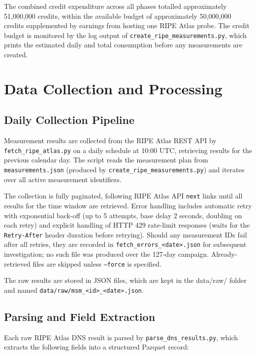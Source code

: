 The combined credit expenditure across all phases totalled approximately 51,000,000 credits, within the available budget of approximately 50,000,000 credits supplemented by earnings from hosting one RIPE Atlas probe. The credit budget is monitored by the log output of \texttt{create\_ripe\_measurements.py}, which prints the estimated daily and total consumption before any measurements are created.

\section{Data Collection and Processing}
\label{sec:3.4}

\subsection{Daily Collection Pipeline}
\label{subsec:3.4.1}

Measurement results are collected from the RIPE Atlas REST API by \texttt{fetch\_ripe\_atlas.py} on a daily schedule at 10:00 UTC, retrieving results for the previous calendar day. The script reads the measurement plan from \texttt{measurements.json} (produced by \texttt{create\_ripe\_measurements.py}) and iterates over all active measurement identifiers.

The collection is fully paginated, following RIPE Atlas API \texttt{next} links until all results for the time window are retrieved. Error handling includes automatic retry with exponential back-off (up to 5 attempts, base delay 2 seconds, doubling on each retry) and explicit handling of \ac{HTTP} 429 rate-limit responses (waits for the \texttt{Retry-After} header duration before retrying). Should any measurement IDs fail after all retries, they are recorded in \texttt{fetch\_errors\_<date>.json} for subsequent investigation; no such file was produced over the 127-day campaign. Already-retrieved files are skipped unless \texttt{--force} is specified.

The raw results are stored in JSON files, which are kept in the data/raw/ folder and named \texttt{data/raw/m\-sm\_<id>\_<date>.json}.

\subsection{Parsing and Field Extraction}
\label{subsec:3.4.2}

Each raw RIPE Atlas \ac{DNS} result is parsed by \texttt{parse\_dns\_results.py}, which extracts the following fields into a structured Parquet record:

